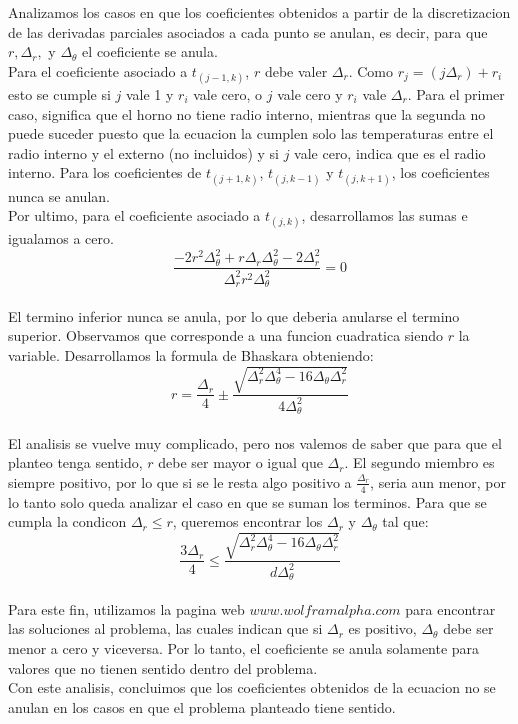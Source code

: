 Analizamos los casos en que los coeficientes obtenidos a partir de la discretizacion de las derivadas parciales asociados a cada punto se anulan, es decir, para que $r, \Delta_r,$ y $\Delta_\theta$ el coeficiente se anula. \\
Para el coeficiente asociado a $t_{(j-1, k)}$, $r$ debe valer $\Delta_r$. Como $r_j = (j \Delta_r) + r_i$ esto se cumple si $j$ vale 1 y $r_i$ vale cero, o $j$ vale cero y $r_i$ vale $\Delta_r$. Para el primer caso, significa que el horno no tiene radio interno, mientras que la segunda no puede suceder puesto que la ecuacion la cumplen solo las temperaturas entre el radio interno y el externo (no incluidos) y si $j$ vale cero, indica que es el radio interno.
Para los coeficientes de $t_{(j+1, k)}$, $t_{(j, k-1)}$ y $t_{(j, k+1)}$, los coeficientes nunca se anulan. \\
Por ultimo, para el coeficiente asociado a $t_{(j, k)}$, desarrollamos las sumas e igualamos a cero. \\
$$\frac{-2r^2 \Delta^2_\theta + r \Delta_r \Delta^2_\theta - 2 \Delta^2_r}{\Delta^2_r r^2 \Delta^2_\theta} = 0$$\\
El termino inferior nunca se anula, por lo que deberia anularse el termino superior. Observamos que corresponde a una funcion cuadratica siendo $r$ la variable. Desarrollamos la formula de Bhaskara obteniendo: \\
$$r = \frac{\Delta_r}{4} \pm \frac{\sqrt{\Delta^2_r \Delta^4_\theta - 16 \Delta_\theta \Delta^2_r}}{4 \Delta^2_\theta}$$ \\
El analisis se vuelve muy complicado, pero nos valemos de saber que para que el planteo tenga sentido, $r$ debe ser mayor o igual que $\Delta_r$.
El segundo miembro es siempre positivo, por lo que si se le resta algo positivo a $\frac{\Delta_r}{4}$, seria aun menor, por lo tanto solo queda analizar el caso en que se suman los terminos. Para que se cumpla la condicon $\Delta_r \leq r$, queremos encontrar los $\Delta_r$ y $\Delta_\theta$ tal que: \\
$$\frac{3 \Delta_r}{4}  \leq \frac{\sqrt{\Delta^2_r \Delta^4_\theta - 16 \Delta_\theta \Delta^2_r}}{d \Delta^2_\theta} $$ \\
Para este fin, utilizamos la pagina web $www.wolframalpha.com$ para encontrar las soluciones al problema, las cuales indican que si $\Delta_r$ es positivo, $\Delta_\theta$ debe ser menor a cero y viceversa. Por lo tanto, el coeficiente se anula solamente para valores que no tienen sentido dentro del problema. \\
Con este analisis, concluimos que los coeficientes obtenidos de la ecuacion no se anulan en los casos en que el problema planteado tiene sentido.
